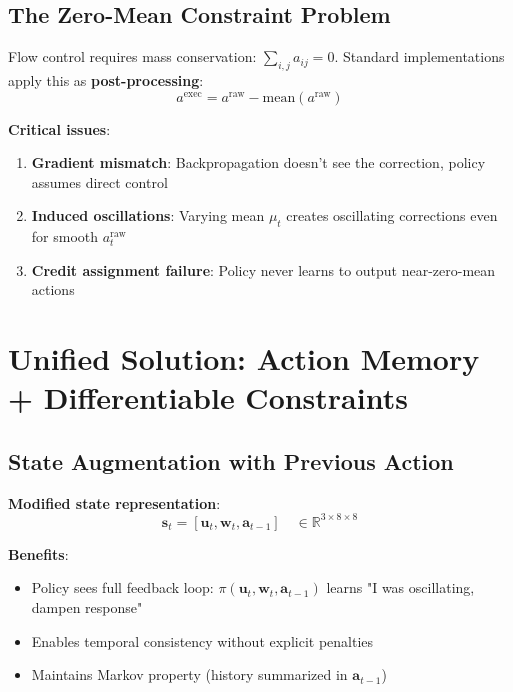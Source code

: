 \documentclass[11pt,a4paper]{article}
\newcommand{\R}{\mathbb{R}}
\theoremstyle{definition}
\begin{document}
\subsection{The Zero-Mean Constraint Problem}

Flow control requires mass conservation: $\sum_{i,j} a_{ij} = 0$. Standard implementations apply this as \textbf{post-processing}:
\begin{equation}
    a^{\text{exec}} = a^{\text{raw}} - \text{mean}(a^{\text{raw}})
\end{equation}

\textbf{Critical issues}:
\begin{enumerate}
    \item \textbf{Gradient mismatch}: Backpropagation doesn't see the correction, policy assumes direct control
    \item \textbf{Induced oscillations}: Varying mean $\mu_t$ creates oscillating corrections even for smooth $a^{\text{raw}}_t$
    \item \textbf{Credit assignment failure}: Policy never learns to output near-zero-mean actions
\end{enumerate}

\section{Unified Solution: Action Memory + Differentiable Constraints}

\subsection{State Augmentation with Previous Action}

\textbf{Modified state representation}:
\begin{equation}
    \mathbf{s}_t = [\mathbf{u}_t, \mathbf{w}_t, \mathbf{a}_{t-1}] \quad \in \R^{3 \times 8 \times 8}
\end{equation}

\textbf{Benefits}:
\begin{itemize}
    \item Policy sees full feedback loop: $\pi(\mathbf{u}_t, \mathbf{w}_t, \mathbf{a}_{t-1})$ learns "I was oscillating, dampen response"
    \item Enables temporal consistency without explicit penalties
    \item Maintains Markov property (history summarized in $\mathbf{a}_{t-1}$)
\end{itemize}
\end{document}
